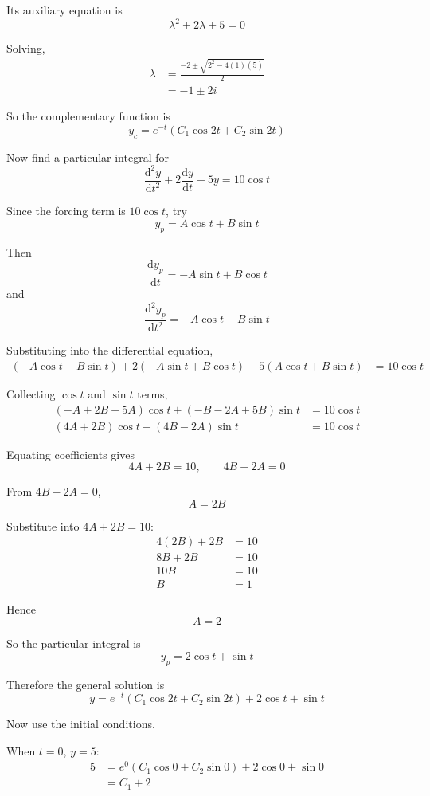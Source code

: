 \documentclass[leqno]{article}
\begin{document}
\begin{enumerate}[
  label=\textbf{\arabic*.},
  leftmargin=*,
  topsep=0pt,
  partopsep=0pt,
  parsep=0pt
]
\begin{tcolorbox}[colback=white, colframe=scarlet, title={\textbf{Solution}}, breakable, grow to left by=6mm, grow to right by=10mm]
Its auxiliary equation is
\[
\lambda^2+2\lambda+5=0
\]

Solving,
\begin{align*}
\lambda &= \frac{-2\pm\sqrt{2^2-4(1)(5)}}{2} \\[4pt]
  &= -1\pm 2i
\end{align*}

So the complementary function is
\[
y_c=e^{-t}(C_1\cos 2t+C_2\sin 2t)
\]

Now find a particular integral for
\[
\frac{\mathrm{d}^2 y}{\mathrm{d} t^2}+2\frac{\mathrm{d} y}{\mathrm{d} t}+5y=10\cos t
\]

Since the forcing term is $10\cos t$, try
\[
y_p=A\cos t+B\sin t
\]

Then
\[
\frac{\mathrm{d} y_p}{\mathrm{d} t}=-A\sin t+B\cos t
\]
and
\[
\frac{\mathrm{d}^2 y_p}{\mathrm{d} t^2}=-A\cos t-B\sin t
\]

Substituting into the differential equation,
\begin{align*}
(-A\cos t-B\sin t)+2(-A\sin t+B\cos t)+5(A\cos t+B\sin t)
&=10\cos t
\end{align*}

Collecting $\cos t$ and $\sin t$ terms,
\begin{align*}
(-A+2B+5A)\cos t+(-B-2A+5B)\sin t &= 10\cos t \\
(4A+2B)\cos t+(4B-2A)\sin t &= 10\cos t
\end{align*}

Equating coefficients gives
\[
4A+2B=10,\qquad 4B-2A=0
\]

From $4B-2A=0$,
\[
A=2B
\]

Substitute into $4A+2B=10$:
\begin{align*}
4(2B)+2B &= 10 \\
8B+2B &= 10 \\
10B &= 10 \\
B &= 1
\end{align*}

Hence
\[
A=2
\]

So the particular integral is
\[
y_p=2\cos t+\sin t
\]

Therefore the general solution is
\[
y=e^{-t}(C_1\cos 2t+C_2\sin 2t)+2\cos t+\sin t
\]

Now use the initial conditions.

When $t=0$, $y=5$:
\begin{align*}
5 &= e^0(C_1\cos 0+C_2\sin 0)+2\cos 0+\sin 0 \\
  &= C_1+2
\end{align*}


\end{tcolorbox}
\end{enumerate}
\end{document}
